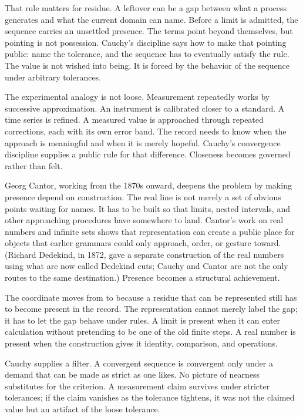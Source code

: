 That rule matters for residue. A leftover can be a gap between what a
process generates and what the current domain can name. Before a limit is
admitted, the sequence carries an unsettled presence. The terms point
beyond themselves, but pointing is not possession. Cauchy's discipline
says how to make that pointing public: name the tolerance, and the
sequence has to eventually satisfy the rule. The value is not wished
into being. It is forced by the behavior of the sequence under arbitrary
tolerances.

The experimental analogy is not loose. Measurement repeatedly works by
successive approximation. An instrument is calibrated closer to a
standard. A time series is refined. A measured value is approached
through repeated corrections, each with its own error band. The record
needs to know when the approach is meaningful and when it is merely
hopeful. Cauchy's convergence discipline supplies a public rule for that
difference. Closeness becomes governed rather than felt.

Georg Cantor, working from the 1870s onward, deepens the problem by
making presence depend on construction. The real line is not merely a set
of obvious points waiting for names. It has to be built so that limits,
nested intervals, and other approaching procedures have somewhere to
land. Cantor's work on real numbers and infinite sets shows that
representation can create a public place for objects that earlier
grammars could only approach, order, or gesture toward. (Richard
Dedekind, in 1872, gave a separate construction of the real numbers
using what are now called Dedekind cuts; Cauchy and Cantor are not the
only routes to the same destination.) Presence becomes a structural
achievement.

The coordinate moves from  to  because
a residue that can be represented still has to become present in the
record. The representation cannot merely label the gap; it has to let
the gap behave under rules. A limit is present when it can enter
calculation without pretending to be one of the old finite steps. A real
number is present when the construction gives it identity, comparison,
and operations.

Cauchy supplies a filter. A convergent sequence is convergent only under
a demand that can be made as strict as one likes. No picture of nearness
substitutes for the criterion. A measurement claim survives under stricter
tolerances; if the claim vanishes as the tolerance tightens, it was not
the claimed value but an artifact of the loose tolerance.


